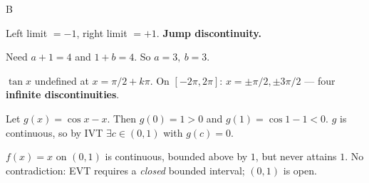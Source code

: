 \documentclass[11pt]{article}
\begin{document}
\begin{answers}{B}
\item Left limit $=-1$, right limit $=+1$. \textbf{Jump discontinuity.}
\item Need $a + 1 = 4$ and $1 + b = 4$. So $\boxed{a = 3,\ b = 3}$.
\item $\tan x$ undefined at $x = \pi/2 + k\pi$. On $[-2\pi, 2\pi]$: $x = \pm \pi/2, \pm 3\pi/2$ --- four \textbf{infinite discontinuities}.
\item Let $g(x) = \cos x - x$. Then $g(0) = 1 > 0$ and $g(1) = \cos 1 - 1 < 0$. $g$ is continuous, so by IVT $\exists c \in (0,1)$ with $g(c)=0$.
\item $f(x) = x$ on $(0,1)$ is continuous, bounded above by $1$, but never attains $1$. No contradiction: EVT requires a \emph{closed} bounded interval; $(0,1)$ is open.
\end{answers}
\end{document}
